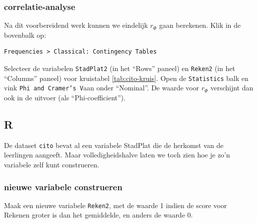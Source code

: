 \documentclass[
]{book}
\newenvironment{Shaded}{\begin{snugshade}}{\end{snugshade}}
\newcommand{\CommentTok}[1]{\textcolor[rgb]{0.56,0.35,0.01}{\textit{#1}}}
\newcommand{\DecValTok}[1]{\textcolor[rgb]{0.00,0.00,0.81}{#1}}
\newcommand{\FunctionTok}[1]{\textcolor[rgb]{0.13,0.29,0.53}{\textbf{#1}}}
\newcommand{\NormalTok}[1]{#1}
\newcommand{\OtherTok}[1]{\textcolor[rgb]{0.56,0.35,0.01}{#1}}
\newcommand{\SpecialCharTok}[1]{\textcolor[rgb]{0.81,0.36,0.00}{\textbf{#1}}}
\begin{document}
\subsubsection{correlatie-analyse}\label{correlatie-analyse-1}

Na dit voorbereidend werk kunnen we eindelijk \(r_\Phi\) gaan berekenen. Klik in de bovenbalk op:

\begin{verbatim}
Frequencies > Classical: Contingency Tables
\end{verbatim}

Selecteer de variabelen \texttt{StadPlat2} (in het ``Rows'' paneel) en \texttt{Reken2} (in het ``Columns'' paneel) voor kruistabel \ref{tab:cito-kruis}. Open de \texttt{Statistics} balk en vink \texttt{Phi\ and\ Cramer’s\ V}aan onder ``Nominal''. De waarde voor \(r_\Phi\) verschijnt dan ook in de uitvoer (als ``Phi-coefficient'').

\subsection{R}\label{r-10}

De dataset \texttt{cito} bevat al een variabele StadPlat die de herkomst van de leerlingen aangeeft. Maar volledigheidshalve laten we toch zien hoe je zo'n variabele zelf kunt construeren.

\subsubsection{nieuwe variabele construeren}\label{nieuwe-variabele-construeren-2}

\begin{Shaded}
\end{Shaded}

Maak een nieuwe variabele \texttt{Reken2}, met de waarde 1 indien de score
voor Rekenen groter is dan het gemiddelde, en anders de waarde 0.
\end{document}
